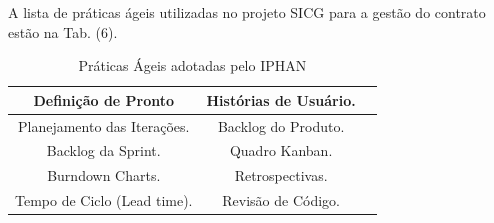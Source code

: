 A lista de práticas ágeis utilizadas no projeto SICG para a gestão do contrato estão na Tab. (6).

\begin{table}[H]
\center
\footnotesize
\begin{tabular}{|c|c|c|}
\hline
 Definição de Pronto              &   Histórias de Usuário.              \\ \hline
Planejamento das Iterações.  &  Backlog do Produto.           \\ \hline
  Backlog da Sprint.             &   Quadro Kanban.              \\ \hline
Burndown Charts.         &  Retrospectivas.            \\ \hline
Tempo de Ciclo (Lead time).         &  Revisão de Código.               \\ \hline
\end{tabular}
\caption{Práticas Ágeis adotadas pelo IPHAN}
\end{table}



